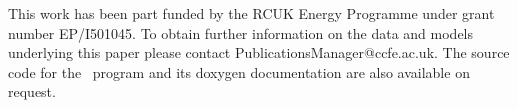 This work has been part funded by the RCUK Energy Programme under grant number
EP/I501045.
To obtain further information on the data and models underlying this
paper please contact PublicationsManager@ccfe.ac.uk.
The source code for the \coden\ program and its doxygen documentation
are also available on request.
